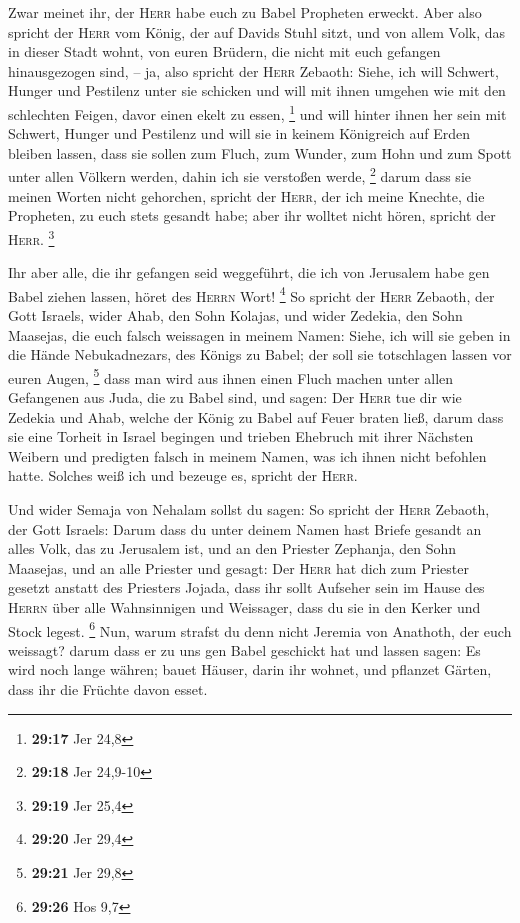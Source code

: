  Zwar meinet ihr, der \textsc{Herr} habe euch zu Babel
Propheten erweckt.  Aber also spricht der \textsc{Herr}
vom König, der auf Davids Stuhl sitzt, und von allem Volk, das in dieser
Stadt wohnt, von euren Brüdern, die nicht mit euch gefangen
hinausgezogen sind,  -- ja, also spricht der
\textsc{Herr} Zebaoth: Siehe, ich will Schwert, Hunger und Pestilenz
unter sie schicken und will mit ihnen umgehen wie mit den schlechten
Feigen, davor einen ekelt zu essen, \footnote{\textbf{29:17} Jer 24,8}
 und will hinter ihnen her sein mit Schwert, Hunger und
Pestilenz und will sie in keinem Königreich auf Erden bleiben lassen,
dass sie sollen zum Fluch, zum Wunder, zum Hohn und zum Spott unter
allen Völkern werden, dahin ich sie verstoßen werde, \footnote{\textbf{29:18}
  Jer 24,9-10}  darum dass sie meinen Worten nicht
gehorchen, spricht der \textsc{Herr}, der ich meine Knechte, die
Propheten, zu euch stets gesandt habe; aber ihr wolltet nicht hören,
spricht der \textsc{Herr}. \footnote{\textbf{29:19} Jer 25,4}

 Ihr aber alle, die ihr gefangen seid weggeführt, die ich
von Jerusalem habe gen Babel ziehen lassen, höret des \textsc{Herrn}
Wort! \footnote{\textbf{29:20} Jer 29,4}  So spricht der
\textsc{Herr} Zebaoth, der Gott Israels, wider Ahab, den Sohn Kolajas,
und wider Zedekia, den Sohn Maasejas, die euch falsch weissagen in
meinem Namen: Siehe, ich will sie geben in die Hände Nebukadnezars, des
Königs zu Babel; der soll sie totschlagen lassen vor euren Augen,
\footnote{\textbf{29:21} Jer 29,8}  dass man wird aus
ihnen einen Fluch machen unter allen Gefangenen aus Juda, die zu Babel
sind, und sagen: Der \textsc{Herr} tue dir wie Zedekia und Ahab, welche
der König zu Babel auf Feuer braten ließ,  darum dass sie
eine Torheit in Israel begingen und trieben Ehebruch mit ihrer Nächsten
Weibern und predigten falsch in meinem Namen, was ich ihnen nicht
befohlen hatte. Solches weiß ich und bezeuge es, spricht der
\textsc{Herr}.

 Und wider Semaja von Nehalam sollst du sagen:
 So spricht der \textsc{Herr} Zebaoth, der Gott Israels:
Darum dass du unter deinem Namen hast Briefe gesandt an alles Volk, das
zu Jerusalem ist, und an den Priester Zephanja, den Sohn Maasejas, und
an alle Priester und gesagt:  Der \textsc{Herr} hat dich
zum Priester gesetzt anstatt des Priesters Jojada, dass ihr sollt
Aufseher sein im Hause des \textsc{Herrn} über alle Wahnsinnigen und
Weissager, dass du sie in den Kerker und Stock legest. \footnote{\textbf{29:26}
  Hos 9,7}  Nun, warum strafst du denn nicht Jeremia von
Anathoth, der euch weissagt?  darum dass er zu uns gen
Babel geschickt hat und lassen sagen: Es wird noch lange währen; bauet
Häuser, darin ihr wohnet, und pflanzet Gärten, dass ihr die Früchte
davon esset.


